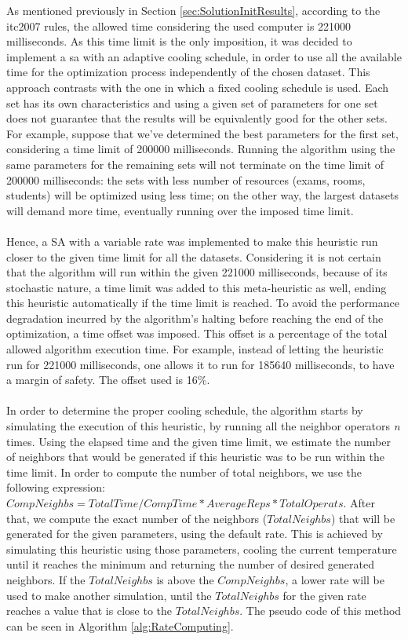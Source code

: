As mentioned previously in Section \ref{sec:SolutionInitResults}, according to the \gls{itc2007} rules, the allowed time considering the used computer is 221000 milliseconds. As this time limit is the only imposition, it was decided to implement a \gls{sa} with an adaptive cooling schedule, in order to use all the available time for the optimization process independently of the chosen dataset. This approach contrasts with the one in which a fixed cooling schedule is used. Each set has its own characteristics and using a given set of parameters for one set does not guarantee that the results will be equivalently good for the other sets. For example, suppose that we've determined the best parameters for the first set, considering a time limit of 200000 milliseconds. Running the algorithm using the same parameters for the remaining sets will not terminate on the time limit of 200000 milliseconds: the sets with less number of resources (exams, rooms, students) will be optimized using less time; on the other way, the largest datasets will demand more time, eventually running over the imposed time limit.\\
\\
Hence, a SA with a variable rate was implemented to make this heuristic run closer to the given time limit for all the datasets. Considering it is not certain that the algorithm will run within the given 221000 milliseconds, because of its stochastic nature, a time limit was added to this meta-heuristic as well, ending this heuristic automatically if the time limit is reached. To avoid the performance degradation incurred by the algorithm's halting before reaching the end of the optimization, a time offset was imposed. This offset is a percentage of the total allowed algorithm execution time. For example, instead of letting the heuristic run for 221000 milliseconds, one allows it to run for 185640 milliseconds, to have a margin of safety. The offset used is 16\%.\\
\\
In order to determine the proper cooling schedule, the algorithm starts by simulating the execution of this heuristic, by running all the neighbor operators \textit{n} times. Using the elapsed time and the given time limit, we estimate the number of neighbors that would be generated if this heuristic was to be run within the time limit. In order to compute the number of total neighbors, we use the following expression: $CompNeighbs = TotalTime / CompTime * AverageReps * TotalOperats$. After that, we compute the exact number of the neighbors ($TotalNeighbs$) that will be generated for the given parameters, using the default rate. This is achieved by simulating this heuristic using those parameters, cooling the current temperature until it reaches the minimum and returning the number of desired generated neighbors. If the $TotalNeighbs$ is above the $CompNeighbs$, a lower rate will be used to make another simulation, until the $TotalNeighbs$ for the given rate reaches a value that is close to the $TotalNeighbs$. The pseudo code of this method can be seen in Algorithm \ref{alg:RateComputing}.\\
